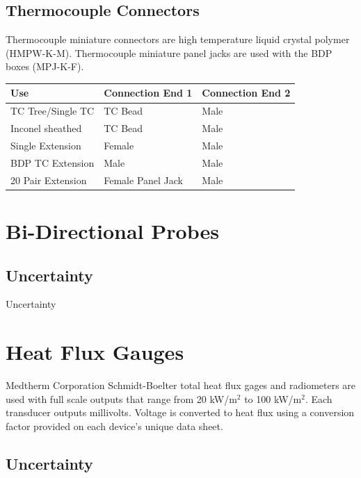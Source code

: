 \documentclass[11pt,oneside]{book}
\begin{document}
\section{Thermocouple Connectors}

Thermocouple miniature connectors are high temperature liquid crystal polymer (HMPW-K-M). Thermocouple miniature panel jacks are used with the BDP boxes (MPJ-K-F).

\begin{table}[h!]
\centering
{}\label{tab:TC_connect}
\begin{tabular}{l l l}
\toprule[1.5pt]
Use & Connection End 1 & Connection End 2  \\
\midrule
TC Tree/Single TC    & TC Bead                 & Male  \\ 
Inconel sheathed      & TC Bead                 & Male  \\
Single Extension       & Female                   & Male  \\
BDP TC Extension    & Male                       & Male \\
20 Pair Extension     & Female Panel Jack & Male \\
\bottomrule[1.25pt]
\end{tabular}\par
\end{table}



\chapter{Bi-Directional Probes}

\section{Uncertainty}

Uncertainty


\chapter{Heat Flux Gauges}

Medtherm Corporation Schmidt-Boelter total heat flux gages and radiometers are used with full scale outputs that range from 20 kW/m$^2$ to 100 kW/m$^2$. Each transducer outputs millivolts. Voltage is converted to heat flux using a conversion factor provided on each device's unique data sheet.

\section{Uncertainty}
\end{document}
